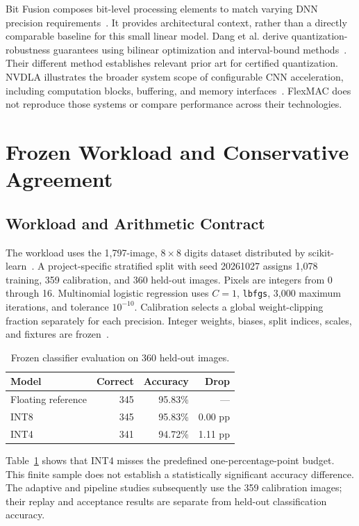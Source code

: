 Bit Fusion composes bit-level processing elements to match varying DNN precision requirements~\cite{bitfusion}. It provides architectural context, rather than a directly comparable baseline for this small linear model. Dang et al. derive quantization-robustness guarantees using bilinear optimization and interval-bound methods~\cite{dang}. Their different method establishes relevant prior art for certified quantization. NVDLA illustrates the broader system scope of configurable CNN acceleration, including computation blocks, buffering, and memory interfaces~\cite{nvdla}. FlexMAC does not reproduce those systems or compare performance across their technologies.

\section{Frozen Workload and Conservative Agreement}
\subsection{Workload and Arithmetic Contract}
The workload uses the 1,797-image, $8\times8$ digits dataset distributed by scikit-learn~\cite{digits}. A project-specific stratified split with seed 20261027 assigns 1,078 training, 359 calibration, and 360 held-out images. Pixels are integers from 0 through 16. Multinomial logistic regression uses $C=1$, \texttt{lbfgs}, 3,000 maximum iterations, and tolerance $10^{-10}$. Calibration selects a global weight-clipping fraction separately for each precision. Integer weights, biases, split indices, scales, and fixtures are frozen~\cite{flexmac}.

\begin{table}[t]
\caption{Frozen classifier evaluation on 360 held-out images.}
\label{tab:accuracy}
\centering
\begin{tabular}{lrrr}
\toprule
Model & Correct & Accuracy & Drop \\
\midrule
Floating reference & 345 & 95.83\% & --- \\
INT8 & 345 & 95.83\% & 0.00 pp \\
INT4 & 341 & 94.72\% & 1.11 pp \\
\bottomrule
\end{tabular}
\end{table}

Table~\ref{tab:accuracy} shows that INT4 misses the predefined one-percentage-point budget. This finite sample does not establish a statistically significant accuracy difference. The adaptive and pipeline studies subsequently use the 359 calibration images; their replay and acceptance results are separate from held-out classification accuracy.

